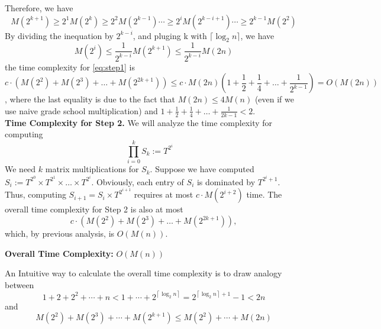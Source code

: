 Therefore, we have \[M(2^{k+1}) \geq 2^1M(2^{k}) \geq 2^2M(2^{k-1})\cdots \geq 2^iM(2^{k-i+1}) \cdots \geq 2^{k-1}M(2^2)\]
By dividing the inequation by $2^{k-i}$, and pluging k with $\lceil \log_2 n \rceil$, we have 
\[ M(2^i)\leq \frac{1}{2^{k-i}}M(2^{k+1}) \leq \frac{1}{2^{k-i}}M(2n) \]
the time complexity for \eqref{eq:step1} is
\[c \cdot (M(2^2) + M(2^3) + \ldots + M(2^{2k+1})) \leq c \cdot M(2n) \left(1 + \frac{1}{2} + \frac{1}{4} + \ldots + \frac{1}{2^{k-1}}\right) = O(M(2n))\],
where the last equality is due to the fact that $M(2n) \leq 4M(n)$ (even if we use naive grade school multiplication) and $1 + \frac{1}{2} + \frac{1}{4} + \ldots + \frac{1}{2k-1} < 2$.\\

\textbf{Time Complexity for Step 2.} We will analyze the time complexity for computing
\[
\prod_{i=0}^{k} S_k := T^{2^i} \quad 
\]
We need $k$ matrix multiplications for $S_k$. Suppose we have computed $S_i := T^{2^0} \times T^{2^1} \times \ldots \times T^{2^i}$. Obviously, each entry of $S_i$ is dominated by $T^{2^i+1}$. 
Thus, computing $S_{i+1} = S_i \times T^{2^{i+1}}$ requires at most $c \cdot M(2^{i+2})$ time. The overall time complexity for Step 2 is also at most
\[
c \cdot (M(2^2) + M(2^3) + \ldots + M(2^{2k+1})),
\]
which, by previous analysis, is $O(M(n))$.

\textbf{Overall Time Complexity:} $O(M(n))$

\begin{remark}
 An Intuitive way to calculate the overall time complexity is to draw analogy between
 \[1+2+2^2+\cdots+n<1+\cdots+2^{\left\lceil \log_2 n\right\rceil }=2^{\left\lceil \log_2 n\right\rceil +1}-1<2n
    \]
and
 \[ M(2^2)+M(2^3)+\cdots+M(2^{k+1})\leq M(2^2)+\cdots +M(2n)
    \] 
\end{remark}





    
